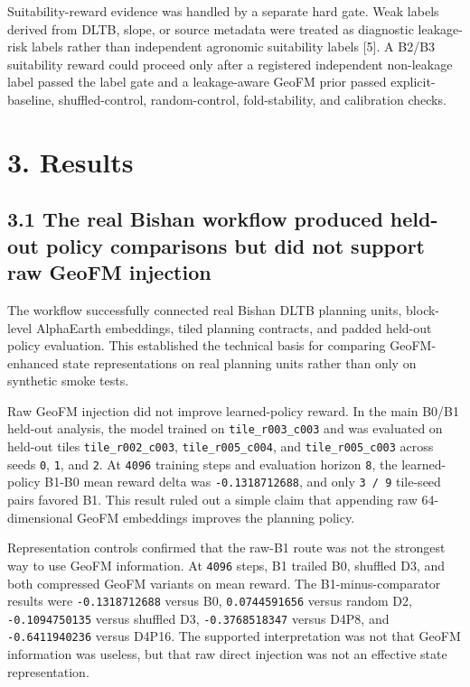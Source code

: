 \documentclass[
  11pt,
  a4paper,
]{article}
\begin{document}
Suitability-reward evidence was handled by a separate hard gate. Weak
labels derived from DLTB, slope, or source metadata were treated as
diagnostic leakage-risk labels rather than independent agronomic
suitability labels {[}5{]}. A B2/B3 suitability reward could proceed
only after a registered independent non-leakage label passed the label
gate and a leakage-aware GeoFM prior passed explicit-baseline,
shuffled-control, random-control, fold-stability, and calibration
checks.

\section{3. Results}\label{results}

\subsection{3.1 The real Bishan workflow produced held-out policy
comparisons but did not support raw GeoFM
injection}\label{the-real-bishan-workflow-produced-held-out-policy-comparisons-but-did-not-support-raw-geofm-injection}

The workflow successfully connected real Bishan DLTB planning units,
block-level AlphaEarth embeddings, tiled planning contracts, and padded
held-out policy evaluation. This established the technical basis for
comparing GeoFM-enhanced state representations on real planning units
rather than only on synthetic smoke tests.

Raw GeoFM injection did not improve learned-policy reward. In the main
B0/B1 held-out analysis, the model trained on \texttt{tile\_r003\_c003}
and was evaluated on held-out tiles \texttt{tile\_r002\_c003},
\texttt{tile\_r005\_c004}, and \texttt{tile\_r005\_c003} across seeds
\texttt{0}, \texttt{1}, and \texttt{2}. At \texttt{4096} training steps
and evaluation horizon \texttt{8}, the learned-policy B1-B0 mean reward
delta was \texttt{-0.1318712688}, and only \texttt{3\ /\ 9} tile-seed
pairs favored B1. This result ruled out a simple claim that appending
raw 64-dimensional GeoFM embeddings improves the planning policy.

Representation controls confirmed that the raw-B1 route was not the
strongest way to use GeoFM information. At \texttt{4096} steps, B1
trailed B0, shuffled D3, and both compressed GeoFM variants on mean
reward. The B1-minus-comparator results were \texttt{-0.1318712688}
versus B0, \texttt{0.0744591656} versus random D2,
\texttt{-0.1094750135} versus shuffled D3, \texttt{-0.3768518347} versus
D4P8, and \texttt{-0.6411940236} versus D4P16. The supported
interpretation was not that GeoFM information was useless, but that raw
direct injection was not an effective state representation.
\end{document}

